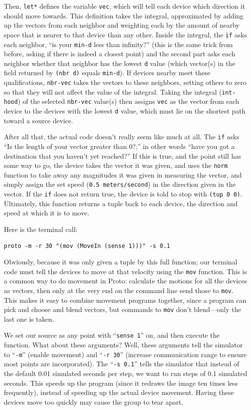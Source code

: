 \documentclass{article}
\newcommand\code[1]{\begin{center}\var{#1}\end{center}}
\newcommand\var[1]{{\tt #1}}
\newcommand\qvar[1]{``{\tt #1}''}
\begin{document}
Then, \var{let*} defines the variable \var{vec}, which will tell each
device which direction it should move towards.  This definition takes
the integral, approximated by adding up the vectors from each neighbor
and weighting each by the amount of nearby space that is nearer to
that device than any other.  Inside the integral, the \var{if} asks
each neighbor, ``is your \var{min-d} less than infinity?'' (this is the
same trick from before, asking if there is indeed a closest point) and
the second part asks each neighbor whether that neighbor has the
lowest \var{d} value (which vector(s) in the field returned by
\var{(nbr d)} equals \var{min-d}).  If devices nearby meet these
qualifications, \var{nbr-vec} takes the vectors to these neighbors,
setting others to zero so that they will not affect the value of the
integral.  Taking the integral (\var{int-hood}) of the selected
\var{nbr-vec} value(s) then assigns \var{vec} as the vector from each
device to the devices with the lowest \var{d} value, which must lie on
the shortest path toward a source device.

After all that, the actual code doesn't really seem like much at all.
The \var{if} asks ``Is the length of your vector greater than 0?;'' in
other words ``have you got a destination that you haven't yet
reached?''  If this is true, and the point still has some way to go,
the device takes the vector it was given, and uses the \var{norm}
function to take away any magnitudes it was given in measuring the
vector, and simply assign the set speed (\var{0.5 meters/second}) in
the direction given in the vector.  If the \var{if} does not return
true, the device is told to stop with \var{(tup 0 0)}.  Ultimately,
this function returns a tuple back to each device, the direction and
speed at which it is to move.

Here is the terminal call:

\code{proto -m -r 30 "(mov (MoveIn (sense 1)))" -s 0.1}

Obviously, because it was only given a tuple by this full function;
our terminal code must tell the devices to move at that velocity using
the \var{mov} function.  This is a common way to do movement in Proto:
calculate the motions for all the devices as vectors, then only at the
very end on the command line send those to \var{mov}.  This makes it
easy to combine movement programs together, since a program can pick
and choose and blend vectors, but commands to \var{mov} don't
blend---only the last one is taken.

We set our source as any point with \qvar{sense 1} on, and then
execute the function.  What about these arguments?  Well, these
arguments tell the simulator to \qvar{-m} (enable movement) and
\qvar{-r 30} (increase communication range to ensure most points are
incorporated).  The \qvar{-s 0.1} tells the simulator that instead of
the default 0.01 simulated seconds per step, we want to run steps of
0.1 simulated seconds.  This speeds up the program (since it redraws
the image ten times less frequently), instead of speeding up the
actual device movement.  Having these devices move too quickly may
cause the group to tear apart. 
\end{document}
